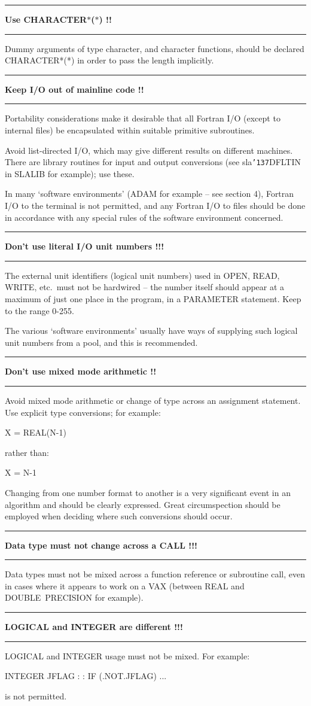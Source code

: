 \documentclass[twoside,11pt,nolof,noabs]{starlink}
\newcounter{sruleno}
\providecommand{\srule}[1]{
    \addtocounter{sruleno}{1}
    \goodbreak
    \rule{\textwidth}{0.3mm}
    \textbf{#1} \scpushright{ \textbf{\thesruleno}}
    \rule{\textwidth}{0.1mm}
}
\renewcommand{\_}{{\tt\char'137}}
\begin{document}
\srule{Use CHARACTER$\ast$($\ast$) !!}
Dummy arguments of type character, and character functions, should be declared
CHARACTER*(*) in order to pass the length implicitly.

\srule{Keep I/O out of mainline code !!}
Portability considerations make it desirable that all Fortran I/O (except to
internal files) be encapsulated within suitable primitive subroutines.

Avoid list-directed I/O, which may give different results on different machines.
There are library routines for input and output conversions
(see sla\_DFLTIN in SLALIB for example); use these.

In many `software environments' (ADAM for example -- see section 4), Fortran
I/O to the terminal is not permitted, and any Fortran I/O to files should be
done in accordance with any special rules of the software environment concerned.

\srule{Don't use literal I/O unit numbers !!!}
The external unit identifiers (logical unit numbers) used in OPEN, READ, WRITE,
etc.\ must not be hardwired -- the number itself should appear at a
maximum of just one place in the program, in a PARAMETER statement.
Keep to the range 0-255.

The various `software environments' usually have ways of supplying such logical
unit numbers from a pool, and this is recommended.

\srule{Don't use mixed mode arithmetic !!}
Avoid mixed mode arithmetic or change of type across an assignment statement.
Use explicit type conversions; for example:
\begin{terminalv}
    X = REAL(N-1)
\end{terminalv}
rather than:
\begin{terminalv}
    X = N-1
\end{terminalv}

Changing from one number format to another is a very significant
event in an algorithm and should be clearly expressed.  Great
circumspection should be employed when deciding where such
conversions should occur.

\srule{Data type must not change across a CALL !!!}
Data types must not be mixed across a function reference or subroutine call,
even in cases where it appears to work on a VAX (between REAL and
DOUBLE~PRECISION for example).

\srule{LOGICAL and INTEGER are different !!!}
LOGICAL and INTEGER usage must not be mixed.  For example:
\begin{terminalv}
    INTEGER JFLAG
       :
       :
    IF (.NOT.JFLAG) ...
\end{terminalv}
is not permitted.
\end{document}
